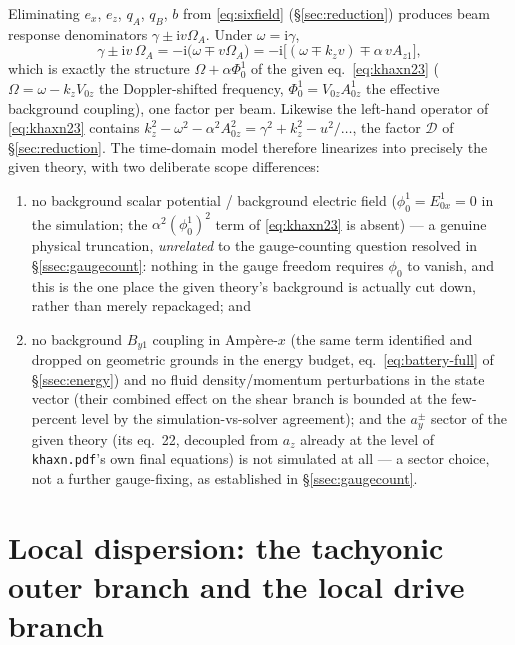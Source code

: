 \documentclass[11pt,a4paper]{article}
\numberwithin{equation}{section}
\theoremstyle{remark}
\newcommand{\kz}{k_z}
\newcommand{\OmA}{\Omega_A}
\newcommand{\Az}{A_{z1}}
\newcommand{\D}{\mathcal{D}}
\newcommand{\ii}{\mathrm{i}}
\begin{document}
Eliminating $e_x$, $e_z$, $q_A$, $q_B$, $b$ from \eqref{eq:sixfield}
(\S\ref{sec:reduction}) produces beam response denominators
$\gamma\pm\ii v\OmA$. Under $\omega=\ii\gamma$,
\begin{equation}
\gamma\pm\ii v\,\OmA=-\ii\bigl(\omega\mp v\OmA\bigr)
=-\ii\bigl[(\omega\mp\kz v)\mp\alpha\,v\Az\bigr],
\end{equation}
which is exactly the structure $\Omega+\alpha\Phi_0^1$ of the given
eq.~\eqref{eq:khaxn23} ($\Omega=\omega-\kz V_{0z}$ the Doppler-shifted
frequency, $\Phi_0^1=V_{0z}A_{0z}^1$ the effective background coupling),
one factor per beam. Likewise the left-hand operator of
\eqref{eq:khaxn23} contains $\kz^2-\omega^2-\alpha^2A_{0z}^2
=\gamma^2+\kz^2-u^2/\ldots$, the factor $\D$ of
\S\ref{sec:reduction}. The time-domain model therefore linearizes into
precisely the given theory, with two deliberate scope differences:
\begin{enumerate}
\item no background scalar potential / background electric field
($\phi_0^1=E^1_{0x}=0$ in the simulation; the $\alpha^2(\phi_0^1)^2$ term
of \eqref{eq:khaxn23} is absent) --- a genuine physical truncation,
\emph{unrelated} to the gauge-counting question resolved in
\S\ref{ssec:gaugecount}: nothing in the gauge freedom requires $\phi_0$
to vanish, and this is the one place the given theory's background is
actually cut down, rather than merely repackaged; and
\item no background $B_{y1}$ coupling in Amp\`ere-$x$ (the same term
identified and dropped on geometric grounds in the energy budget,
eq.~\eqref{eq:battery-full} of \S\ref{ssec:energy}) and no fluid
density/momentum perturbations in the state vector (their combined effect
on the shear branch is bounded at the few-percent level by the
simulation-vs-solver agreement); and the $a_y^\pm$ sector of the given
theory (its eq.~22, decoupled from $a_z$ already at the level of
\texttt{khaxn.pdf}'s own final equations) is not simulated at all --- a
sector choice, not a further gauge-fixing, as established in
\S\ref{ssec:gaugecount}.
\end{enumerate}

\section{Local dispersion: the tachyonic outer branch and the local drive
branch}
\label{sec:local}
\end{document}

